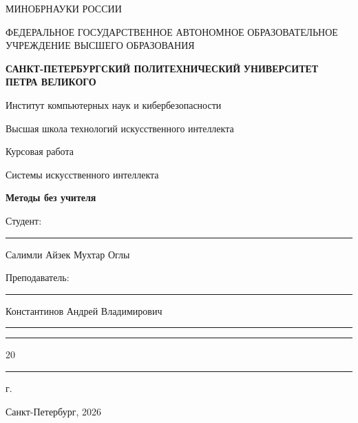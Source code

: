 \documentclass[areasetadvanced]{scrartcl}
\begin{document}
\sloppy
	\thispagestyle{empty}
	\begin{center}
		\large{МИНОБРНАУКИ РОССИИ} \par
		\vspace{0.3cm}
		\normalsize
		{ФЕДЕРАЛЬНОЕ ГОСУДАРСТВЕННОЕ АВТОНОМНОЕ ОБРАЗОВАТЕЛЬНОЕ УЧРЕЖДЕНИЕ ВЫСШЕГО ОБРАЗОВАНИЯ} \par
		\vspace{0.3cm}
		\textbf{САНКТ-ПЕТЕРБУРГСКИЙ ПОЛИТЕХНИЧЕСКИЙ}
		\textbf{УНИВЕРСИТЕТ ПЕТРА ВЕЛИКОГО} \par
		\vspace{0.3cm}
		{Институт компьютерных наук и кибербезопасности}\par
		{Высшая школа технологий искусственного интеллекта}\par
	\end{center}
	\vfill
	\begin{center}
		{\huge Курсовая работа}\par
        \large{\guillemetleft Системы искусственного интеллекта\guillemetright} \par
        \vspace{0.3cm}
		\Huge \textbf{Методы без учителя}\par
	\end{center}
	\vfill
	\begin{flushleft}
		Студент: \hspace{1.8cm} \rule[0pt]{2.5cm}{0.5pt}\hfill Салимли Айзек Мухтар Оглы\par
		\vspace{1.5cm}
		Преподаватель: \hspace{0.55cm} \rule[0pt]{2.5cm}{0.5pt}\hfill  Константинов Андрей Владимирович
	\end{flushleft}
	\vspace{0.5cm}
	\begin{flushright}
		\guillemotleft \rule[0pt]{0.8cm}{0.5pt}\guillemotright \rule[0pt]{2cm}{0.5pt} 20\rule[0pt]{0.5cm}{0.5pt} г.
	\end{flushright}
	\vfill
	\begin{center}
		Санкт-Петербург, 2026
	\end{center}
    \newpage
    
\end{document}
